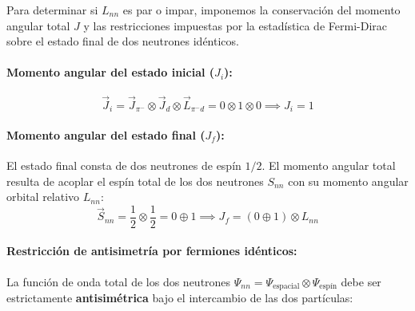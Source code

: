 Para determinar si $L_{nn}$ es par o impar, imponemos la conservación del momento angular total $J$ y las restricciones impuestas por la estadística de Fermi-Dirac sobre el estado final de dos neutrones idénticos.

\paragraph{Momento angular del estado inicial ($J_i$):}
\begin{equation}
    \vec{J}_i = \vec{J}_{\pi^-} \otimes \vec{J}_d \otimes \vec{L}_{\pi^- d} = 0 \otimes 1 \otimes 0 \implies J_i = 1
\end{equation}

\paragraph{Momento angular del estado final ($J_f$):}
El estado final consta de dos neutrones de espín $1/2$. El momento angular total resulta de acoplar el espín total de los dos neutrones $S_{nn}$ con su momento angular orbital relativo $L_{nn}$:
\begin{equation}
    \vec{S}_{nn} = \frac{1}{2} \otimes \frac{1}{2} = 0 \oplus 1 \implies J_f = (0 \oplus 1) \otimes L_{nn}
\end{equation}

\paragraph{Restricción de antisimetría por fermiones idénticos:}
La función de onda total de los dos neutrones $\Psi_{nn} = \Psi_{\text{espacial}} \otimes \Psi_{\text{espín}}$ debe ser estrictamente \textbf{antisimétrica} bajo el intercambio de las dos partículas:


